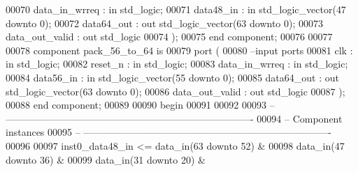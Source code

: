 \begin{DoxyCode}
00070         data_in_wrreq   : \textcolor{keywordflow}{in} \textcolor{comment}{std\_logic};
00071         data48_in       : \textcolor{keywordflow}{in} \textcolor{comment}{std\_logic\_vector}(\textcolor{vhdllogic}{}\textcolor{vhdllogic}{47} \textcolor{keywordflow}{downto} \textcolor{vhdllogic}{}\textcolor{vhdllogic}{0});
00072         data64_out      : \textcolor{keywordflow}{out} \textcolor{comment}{std\_logic\_vector}(\textcolor{vhdllogic}{}\textcolor{vhdllogic}{63} \textcolor{keywordflow}{downto} \textcolor{vhdllogic}{}\textcolor{vhdllogic}{0});
00073         data_out_valid  : \textcolor{keywordflow}{out} \textcolor{comment}{std\_logic}       
00074         );
00075 \textcolor{keywordflow}{end} \textcolor{keywordflow}{component};
00076 
00077 
00078 \textcolor{keywordflow}{component} pack_56_to_64 \textcolor{keywordflow}{is}
00079   \textcolor{keywordflow}{port} (
00080 \textcolor{keyword}{      --input ports }
00081       clk               : \textcolor{keywordflow}{in} \textcolor{comment}{std\_logic};
00082       reset_n           : \textcolor{keywordflow}{in} \textcolor{comment}{std\_logic};
00083         data_in_wrreq   : \textcolor{keywordflow}{in} \textcolor{comment}{std\_logic};
00084         data56_in       : \textcolor{keywordflow}{in} \textcolor{comment}{std\_logic\_vector}(\textcolor{vhdllogic}{}\textcolor{vhdllogic}{55} \textcolor{keywordflow}{downto} \textcolor{vhdllogic}{}\textcolor{vhdllogic}{0});
00085         data64_out      : \textcolor{keywordflow}{out} \textcolor{comment}{std\_logic\_vector}(\textcolor{vhdllogic}{}\textcolor{vhdllogic}{63} \textcolor{keywordflow}{downto} \textcolor{vhdllogic}{}\textcolor{vhdllogic}{0});
00086         data_out_valid  : \textcolor{keywordflow}{out} \textcolor{comment}{std\_logic}       
00087         );
00088 \textcolor{keywordflow}{end} \textcolor{keywordflow}{component};
00089   
00090 \textcolor{vhdlkeyword}{begin}
00091 
00092 
00093 \textcolor{keyword}{-- ----------------------------------------------------------------------------}
00094 \textcolor{keyword}{-- Component instances}
00095 \textcolor{keyword}{-- ----------------------------------------------------------------------------}
00096 
00097 inst0\_data48\_in <=   data\_in(\textcolor{vhdllogic}{63} \textcolor{keywordflow}{downto} \textcolor{vhdllogic}{52}) & 
00098                      \textcolor{vhdlchar}{data_in}\textcolor{vhdlchar}{(}\textcolor{vhdllogic}{}\textcolor{vhdllogic}{47} \textcolor{keywordflow}{downto} \textcolor{vhdllogic}{}\textcolor{vhdllogic}{36}\textcolor{vhdlchar}{)} \textcolor{vhdlchar}{&}
00099                      \textcolor{vhdlchar}{data_in}\textcolor{vhdlchar}{(}\textcolor{vhdllogic}{}\textcolor{vhdllogic}{31} \textcolor{keywordflow}{downto} \textcolor{vhdllogic}{}\textcolor{vhdllogic}{20}\textcolor{vhdlchar}{)} \textcolor{vhdlchar}{&}                    

\end{DoxyCode}
